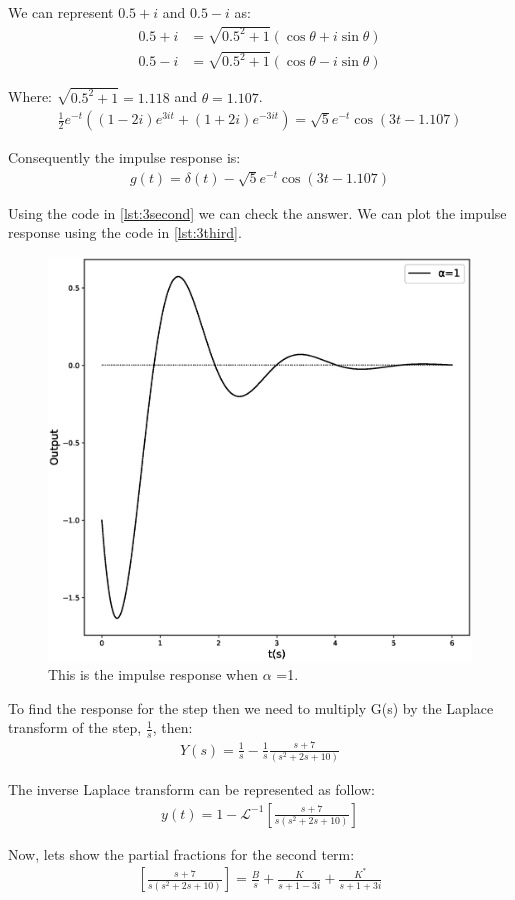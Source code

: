 \documentclass[a4paper,11pt]{article}
\begin{document}
\par We can represent $0.5+i$ and $0.5-i$ as:
\begin{align*}
0.5+i &= \sqrt{0.5^2+1}(\cos\theta+i\sin\theta)\\
0.5-i &= \sqrt{0.5^2+1}(\cos\theta-i\sin\theta)
\end{align*}
\par Where: $\sqrt{0.5^2+1}=1.118$ and $\theta= 1.107$.
\begin{align}
\frac{1}{2}e^{-t}\left(\left(1-2i\right) e^{3it}+ \left(1+2i\right) e^{-3it}\right)=\sqrt{5}e^{-t}\cos(3t-1.107)
\end{align}
\par Consequently the impulse response is:
\begin{align}
g(t) = \delta(t) -\sqrt{5}e^{-t}\cos\left(3t-1.107\right)
\end{align}
\par Using the code in \ref{lst:3second} we can check the answer. We can plot the impulse response using the code in \ref{lst:3third}.
\begin{figure}[H]
\centering
\includegraphics[width=0.4\columnwidth]{Figures/Question3/3impulseResponse.eps}
\caption{This is the impulse response when $\alpha$ =1.}
\end{figure}
\par To find the response for the step then we need to multiply G(s) by the Laplace transform of the step, $\frac{1}{s}$, then:
\begin{align}
\label{eq:Eq15}
Y(s) = \frac{1}{s}-\frac{1}{s}\frac{s+7}{(s^2+2s+10)}
\end{align}
\par The inverse Laplace transform can be represented as follow:
\begin{align*}
y(t) = 1- \mathcal{L}^{-1}\left[\frac{s+7}{s(s^2+2s+10)}\right]
\end{align*}
\par Now, lets show the partial fractions for the second term:
\begin{align*}
\left[\frac{s+7}{s(s^2+2s+10)}\right] = \frac{B}{s}+\frac{K}{s+1-3i}+\frac{K^*}{s+1+3i} 
\end{align*}
\end{document}
